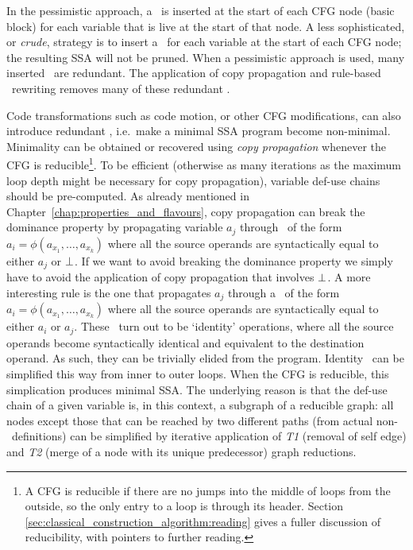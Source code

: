 In the pessimistic approach, a \phiop\ is inserted at the start of each CFG node
(basic block) for each variable that is live at the start of that
node.
A less sophisticated, or \textit{crude}, %
strategy is to insert a \phiop\ for
each variable at the start of each CFG node;
the resulting SSA will not be pruned.
When a pessimistic approach is used, many inserted \phiops\ are
redundant. The application of 
copy propagation and rule-based \phiop\ rewriting
removes many of these redundant \phiops.


Code transformations such as code motion, or other CFG modifications, 
can also introduce redundant \phiops, i.e.\
make a minimal SSA program become non-minimal.
Minimality can be obtained or recovered using 
\textit{copy propagation} whenever the CFG is reducible\footnote{
A CFG is reducible if there are no jumps into the middle of loops
from the outside, so the only entry to a loop is through its header.
Section \ref{sec:classical_construction_algorithm:reading} 
gives a fuller discussion of reducibility, with
pointers to further reading.
}.
To be efficient (otherwise as many iterations as the maximum loop
depth might be necessary for copy propagation), 
variable def-use chains should be pre-computed. 
As already mentioned in Chapter~\ref{chap:properties_and_flavours}, 
copy propagation can break the dominance property by propagating
variable $a_j$ through \phiops\ of the form $a_i=\phi(a_{x_1},\ldots,a_{x_k})$ where
all the source operands are syntactically equal to either $a_j$ or $\perp$. 
If we want to avoid breaking the dominance property we simply have to
avoid the application of copy propagation that involves $\perp$. 
A more interesting rule is the one that propagates $a_j$ through a
\phiop\ of the form $a_i=\phi(a_{x_1},\ldots,a_{x_k})$ where all the source operands are
syntactically equal to either $a_i$ or $a_j$. 
These \phiops\ turn out to be `identity' operations, where all the
source operands become syntactically identical and equivalent to the 
destination operand. As such, they can be trivially elided from the program.
Identity \phiops\ can be simplified this way from inner to outer loops. 
When the CFG is reducible, this simplication produces minimal SSA. 
The underlying reason is that the def-use chain of a given variable is,
in this context, a subgraph of a reducible graph: 
all nodes except those that can be reached by two different paths (from
actual non-\phiop\ definitions) can be simplified by iterative 
application of 
\emph{T1} (removal of self edge) and 
\emph{T2} (merge of a node with its unique predecessor) graph reductions.
